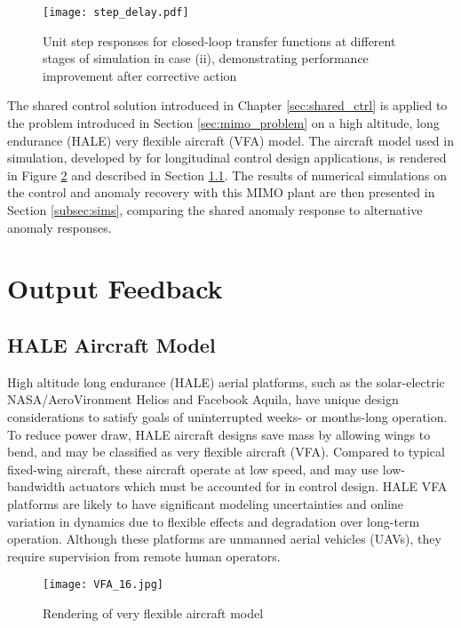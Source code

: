 \begin{figure}[h!]
	\centering
	\texttt{[image: step\_delay.pdf]}
	\caption{Unit step responses for closed-loop transfer functions at different stages of simulation in case (ii), demonstrating performance improvement after corrective action}
	\label{fig:step_delay}
\end{figure}

The shared control solution introduced in Chapter \ref{sec:shared_ctrl} is applied to the problem introduced in Section \ref{sec:mimo_problem} on a high altitude, long endurance (HALE) very flexible aircraft (VFA) model. The aircraft model used in simulation, developed by \cite{gibson2011modeling} for longitudinal control design applications, is rendered in Figure \ref{fig:vfa} and described in Section \ref{subsec:vfa_model}. The results of numerical simulations on the control and anomaly recovery with this MIMO plant are then presented in Section \ref{subsec:sims}, comparing the shared anomaly response to alternative anomaly responses.

\section{Output Feedback}

\subsection{HALE Aircraft Model}\label{subsec:vfa_model}
High altitude long endurance (HALE) aerial platforms, such as the solar-electric NASA/AeroVironment Helios and Facebook Aquila, have unique design considerations to satisfy goals of uninterrupted weeks- or months-long operation. To reduce power draw, HALE aircraft designs save mass by allowing wings to bend, and may be classified as very flexible aircraft (VFA). Compared to typical fixed-wing aircraft, these aircraft operate at low speed, and may use low-bandwidth actuators which must be accounted for in control design. HALE VFA platforms are likely to have significant modeling uncertainties and online variation in dynamics due to flexible effects and degradation over long-term operation. Although these platforms are unmanned aerial vehicles (UAVs), they require supervision from remote human operators.

\begin{figure}[htbp]
	\centering
	\texttt{[image: VFA\_16.jpg]}
	\caption{Rendering of very flexible aircraft model}
	\label{fig:vfa}
\end{figure}

